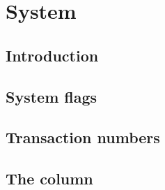 
\section{System}
\subsection{Introduction}               \label{hub: system: intro}               
\subsection{System flags}               \label{hub: system: system flags}        
\subsection{Transaction numbers}        \label{hub: system: transaction numbers} 
\subsection{The \hubStamp{} column}     \label{hub: system: hub stamp}           
